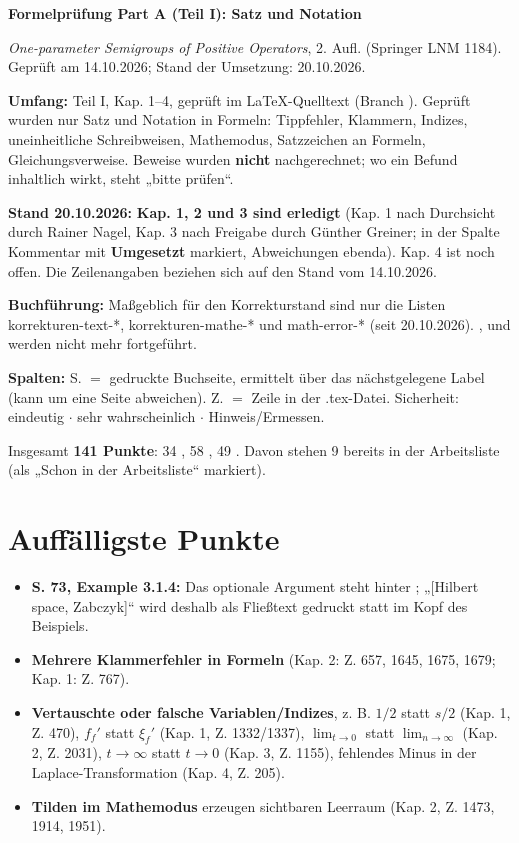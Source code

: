 \documentclass[10pt]{article}
\begin{document}
{\Large\bfseries Formelprüfung Part A (Teil I): Satz und Notation\par}
\smallskip
\emph{One-parameter Semigroups of Positive Operators}, 2. Aufl. (Springer LNM 1184). Geprüft am 14.10.2026; Stand der Umsetzung: 20.10.2026.

\textbf{Umfang:} Teil I, Kap. 1–4, geprüft im LaTeX-Quelltext (Branch ). Geprüft wurden nur Satz und Notation in Formeln: Tippfehler, Klammern, Indizes, uneinheitliche Schreibweisen, Mathemodus, Satzzeichen an Formeln, Gleichungsverweise. Beweise wurden \textbf{nicht} nachgerechnet; wo ein Befund inhaltlich wirkt, steht „bitte prüfen“.

\textbf{Stand 20.10.2026:} \textbf{Kap. 1, 2 und 3 sind erledigt} (Kap. 1 nach Durchsicht durch Rainer Nagel, Kap. 3 nach Freigabe durch Günther Greiner; in der Spalte Kommentar mit \textbf{Umgesetzt} markiert, Abweichungen ebenda). Kap. 4 ist noch offen. Die Zeilenangaben beziehen sich auf den Stand vom 14.10.2026.

\textbf{Buchführung:} Maßgeblich für den Korrekturstand sind nur die Listen {korrekturen-text-*}, {korrekturen-mathe-*} und {math-error-*} (seit 20.10.2026). ,  und  werden nicht mehr fortgeführt.

\textbf{Spalten:} S. $=$ gedruckte Buchseite, ermittelt über das nächstgelegene Label (kann um eine Seite abweichen). Z. $=$ Zeile in der .tex-Datei. Sicherheit: \sichA{} eindeutig $\ensuremath{\cdot}$ \sichB{} sehr wahrscheinlich $\ensuremath{\cdot}$ \sichC{} Hinweis/Ermessen.

Insgesamt \textbf{141 Punkte}: 34 \sichA{}, 58 \sichB{}, 49 \sichC{}. Davon stehen 9 bereits in der Arbeitsliste  (als „Schon in der Arbeitsliste“ markiert).

\section*{Auffälligste Punkte}
\begin{itemize}
\item \textbf{S. 73, Example 3.1.4:} Das optionale Argument steht hinter ; „[Hilbert space, Zabczyk]“ wird deshalb als Fließtext gedruckt statt im Kopf des Beispiels.
\item \textbf{Mehrere Klammerfehler in Formeln} (Kap. 2: Z. 657, 1645, 1675, 1679; Kap. 1: Z. 767).
\item \textbf{Vertauschte oder falsche Variablen/Indizes}, z. B. $1/2$ statt $s/2$ (Kap. 1, Z. 470), $f_f'$ statt $\xi_f'$ (Kap. 1, Z. 1332/1337), $\lim_{t\to0}$ statt $\lim_{n\to\infty}$ (Kap. 2, Z. 2031), $t\to\infty$ statt $t\to0$ (Kap. 3, Z. 1155), fehlendes Minus in der Laplace-Transformation (Kap. 4, Z. 205).
\item \textbf{Tilden \code{\textasciitilde{}} im Mathemodus} erzeugen sichtbaren Leerraum (Kap. 2, Z. 1473, 1914, 1951).
\end{itemize}
\end{document}
